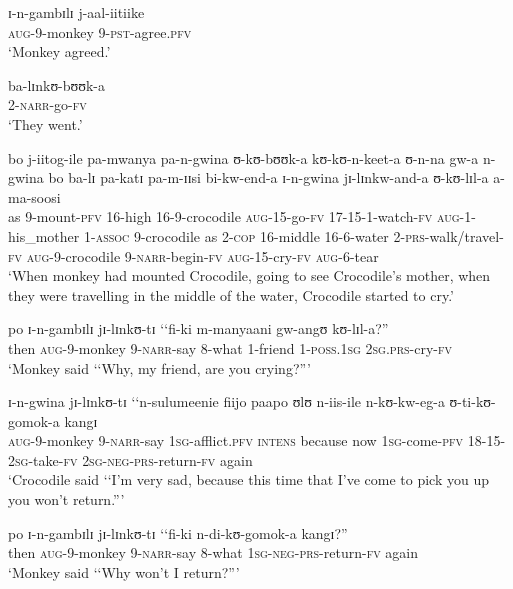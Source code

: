 \begin{exe}
\ex \gll ɪ-n-gambɪlɪ j-aal-iitiike\\
\textsc{aug}-9-monkey 9-\textsc{pst}-agree.\textsc{pfv}\\
\glt \lq Monkey agreed.'

\ex ba-lɪnkʊ-bʊʊk-a\\
2-\textsc{narr}-go-\textsc{fv}\\
\glt \lq They went.'

\ex \gll bo j-iitog-ile pa-mwanya pa-n-gwina ʊ-kʊ-bʊʊk-a kʊ-kʊ-n-keet-a ʊ-n-na gw-a n-gwina bo ba-lɪ pa-katɪ pa-m-ɪɪsi bi-kw-end-a ɪ-n-gwina jɪ-lɪnkw-and-a ʊ-kʊ-lɪl-a a-ma-soosi\\
as 9-mount-\textsc{pfv} 16-high 16-9-crocodile \textsc{aug}-15-go-\textsc{fv} 17-15-1-watch-\textsc{fv} \textsc{aug}-1-his\_mother 1-\textsc{assoc} 9-crocodile as 2-\textsc{cop} 16-middle 16-6-water 2-\textsc{prs}-walk/travel-\textsc{fv} \textsc{aug}-9-crocodile 9-\textsc{narr}-begin-\textsc{fv} \textsc{aug}-15-cry-\textsc{fv} \textsc{aug}-6-tear\\
\glt \lq When monkey had mounted Crocodile, going to see Crocodile's mother, when they were travelling in the middle of the water, Crocodile started to cry.'

\ex \gll po ɪ-n-gambɪlɪ jɪ-lɪnkʊ-tɪ \lq\lq fi-ki m-manyaani gw-angʊ kʊ-lɪl-a?''\\
then \textsc{aug}-9-monkey 9-\textsc{narr}-say \phantom{\lq\lq}8-what 1-friend 1-\textsc{poss.1sg} \textsc{2sg.prs}-cry-\textsc{fv}\\
\glt \lq Monkey said \lq\lq Why, my friend, are you crying?''{}'

\ex \gll ɪ-n-gwina jɪ-lɪnkʊ-tɪ \lq\lq n-sulumeenie fiijo paapo ʊlʊ n-iis-ile n-kʊ-kw-eg-a ʊ-ti-kʊ-gomok-a kangɪ\\
\textsc{aug}-9-monkey 9-\textsc{narr}-say \phantom{\lq\lq}\textsc{1sg}-afflict.\textsc{pfv} \textsc{intens} because now \textsc{1sg}-come-\textsc{pfv} 18-15-\textsc{2sg}-take-\textsc{fv} \textsc{2sg}-\textsc{neg}-\textsc{prs}-return-\textsc{fv} again\\
\glt \lq Crocodile said \lq\lq I'm very sad, because this time that I've come to pick you up you won't return.''{}'

\ex \gll po ɪ-n-gambɪlɪ jɪ-lɪnkʊ-tɪ \lq\lq fi-ki n-di-kʊ-gomok-a kangɪ?''\\
then \textsc{aug}-9-monkey 9-\textsc{narr}-say \phantom{\lq\lq}8-what \textsc{1sg}-\textsc{neg}-\textsc{prs}-return-\textsc{fv} again\\
\glt \lq Monkey said \lq\lq Why won't I return?''{}'


\end{exe}

